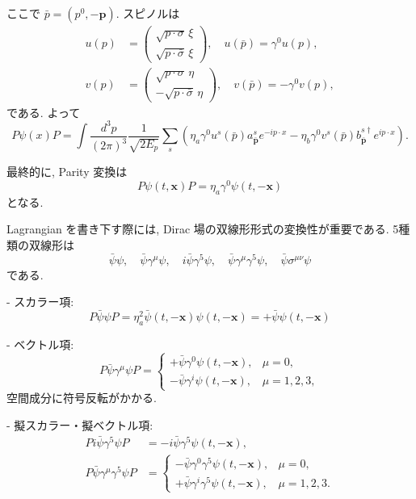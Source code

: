 \documentclass[a4paper,12pt]{article}
\begin{document}
ここで $\bar{p}=(p^0,-\mathbf{p})$.  
スピノルは
\begin{align*}
u(p) &= \begin{pmatrix} \sqrt{p\cdot\sigma}\,\xi \\ \sqrt{p\cdot\bar\sigma}\,\xi \end{pmatrix},
\quad
u(\bar{p}) = \gamma^0 u(p), \\
v(p) &= \begin{pmatrix} \sqrt{p\cdot\sigma}\,\eta \\ -\sqrt{p\cdot\bar\sigma}\,\eta \end{pmatrix},
\quad
v(\bar{p}) = -\gamma^0 v(p),
\end{align*}
である. よって
\begin{equation}
P\psi(x)P = \int \frac{d^3p}{(2\pi)^3}\frac{1}{\sqrt{2E_p}}
\sum_s \left( \eta_a \gamma^0 u^s(\bar{p}) a^s_{\bar{\mathbf{p}}} e^{-ip\cdot x}
- \eta_b \gamma^0 v^s(\bar{p}) b^{s\dagger}_{\bar{\mathbf{p}}} e^{ip\cdot x} \right).
\tag{3.125}
\end{equation}

最終的に, Parity 変換は
\begin{equation}
P\psi(t,\mathbf{x})P = \eta_a \gamma^0 \psi(t,-\mathbf{x})
\tag{3.126}
\end{equation}
となる.

Lagrangian を書き下す際には, Dirac 場の双線形形式の変換性が重要である.  
5種類の双線形は
\begin{equation}
\bar{\psi}\psi, \quad \bar{\psi}\gamma^\mu\psi, \quad 
i\bar{\psi}\gamma^5\psi, \quad 
\bar{\psi}\gamma^\mu\gamma^5\psi, \quad 
\bar{\psi}\sigma^{\mu\nu}\psi
\tag{3.127}
\end{equation}
である.

- スカラー項:
\begin{equation}
P\bar{\psi}\psi P = \eta_a^2 \bar{\psi}(t,-\mathbf{x})\psi(t,-\mathbf{x})
= +\bar{\psi}\psi(t,-\mathbf{x})
\tag{3.129}
\end{equation}

- ベクトル項:
\begin{equation}
P\bar{\psi}\gamma^\mu\psi P =
\begin{cases}
+\bar{\psi}\gamma^0\psi(t,-\mathbf{x}), & \mu=0, \\
-\bar{\psi}\gamma^i\psi(t,-\mathbf{x}), & \mu=1,2,3,
\end{cases}
\tag{3.130}
\end{equation}
空間成分に符号反転がかかる.

- 擬スカラー・擬ベクトル項:
\begin{align}
P i\bar{\psi}\gamma^5\psi P &= -i\bar{\psi}\gamma^5\psi(t,-\mathbf{x}),
\tag{3.131} \\
P \bar{\psi}\gamma^\mu\gamma^5\psi P &=
\begin{cases}
-\bar{\psi}\gamma^0\gamma^5\psi(t,-\mathbf{x}), & \mu=0, \\
+\bar{\psi}\gamma^i\gamma^5\psi(t,-\mathbf{x}), & \mu=1,2,3.
\end{cases}
\tag{3.132}
\end{align}
\end{document}

